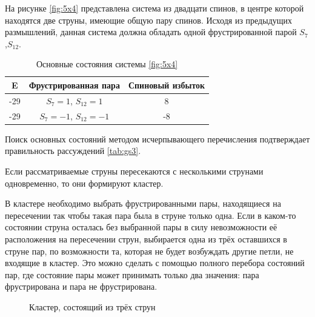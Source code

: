 \documentclass[utf8, babel, sor, jor, amsmath, amssymb, reprint]{elsarticle} %
\begin{document}
На рисунке \eqref{fig:5x4} представлена система из двадцати спинов, в центре которой находятся две струны, имеющие общую пару спинов. Исходя из предыдущих размышлений, данная система должна обладать одной фрустрированной парой  $S_7$,$S_12$.

\begin{table}[h]
	\centering
	\begin{tabular}{|c|c|c|}
		\hline
		E   &   Фрустрированная пара & Спиновый избыток\\
		\hline
		-29   &  $S_7=1$, $S_{12}=1$ & 8 \\
		\hline
		-29   &   $S_7=-1$, $S_{12}=-1$ & -8 \\
		\hline
	\end{tabular}
	\caption{Основные состояния системы \eqref{fig:5x4}}
	\label{tab:gs3}
\end{table}

Поиск основных состояний методом исчерпывающего перечисления подтверждает правильность рассуждений \eqref{tab:gs3}.

Если рассматриваемые струны пересекаются с несколькими струнами одновременно, то они формируют кластер.

В кластере необходимо выбрать фрустрированными пары, находящиеся на пересечении так чтобы такая пара была в струне только одна. Если в каком-то состоянии струна осталась без выбранной пары в силу невозможности её расположения на пересечении струн, выбирается одна из трёх оставшихся в струне пар, по возможности та, которая не будет возбуждать другие петли, не входящие в кластер. Это можно сделать с помощью полного перебора состояний пар, где состояние пары может принимать только два значения: пара фрустрирована и пара не фрустрирована.

\begin{figure}[h]
	\centering
	\caption{Кластер, состоящий из трёх струн}
	\label{fig:cluster}
\end{figure}
\end{document}
